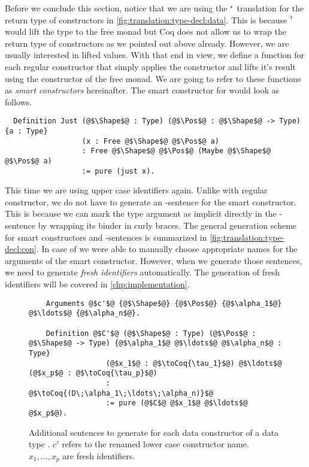 Before we conclude this section, notice that we are using the ${}^{*}$ translation for the return type of constructors in \autoref{fig:translation:type-decl:data}.
This is because ${}^{\dagger}$ would lift the type to the free monad but Coq does not allow us to wrap the return type of constructors as we pointed out above already.
However, we are usually interested in lifted values.
With that end in view, we define a function for each regular constructor that simply applies the constructor and lifts it's result using the  constructor of the free monad.
We are going to refer to these functions as \textit{smart constructors} hereinafter.
The smart constructor for  would look as follows.
\begin{verbatim}
  Definition Just (@$\Shape$@ : Type) (@$\Pos$@ : @$\Shape$@ -> Type) {a : Type}
                  (x : Free @$\Shape$@ @$\Pos$@ a)
                  : Free @$\Shape$@ @$\Pos$@ (Maybe @$\Shape$@ @$\Pos$@ a)
                  := pure (just x).
\end{verbatim}
This time we are using upper case identifiers again.
Unlike with regular constructor, we do not have to generate an -sentence for the smart constructor.
This is because we can mark the type argument as implicit directly in the -sentence by wrapping its binder in curly braces.
The general generation scheme for smart constructors and -sentences is summarized in \autoref{fig:translation:type-decl:con}.
In case of  we were able to manually choose appropriate names for the arguments of the smart constructor.
However, when we generate those sentences, we need to generate \textit{fresh identifiers} automatically.
The generation of fresh identifiers will be covered in \autoref{chp:implementation}. %

\begin{figure}[H]
  \begin{verbatim}
    Arguments @$c'$@ {@$\Shape$@} {@$\Pos$@} {@$\alpha_1$@} @$\ldots$@ {@$\alpha_n$@}.

    Definition @$C'$@ (@$\Shape$@ : Type) (@$\Pos$@ : @$\Shape$@ -> Type) {@$\alpha_1$@ @$\ldots$@ @$\alpha_n$@ : Type}
                  (@$x_1$@ : @$\toCoq{\tau_1}$@) @$\ldots$@ (@$x_p$@ : @$\toCoq{\tau_p}$@)
                  : @$\toCoq{(D\;\alpha_1\;\ldots\;\alpha_n)}$@
                  := pure (@$C$@ @$x_1$@ @$\ldots$@ @$x_p$@).
  \end{verbatim}
  \caption{Additional sentences to generate for each data constructor  of a data type . $c'$ refers to the renamed lower case constructor name. $x_1, \ldots, x_p$ are fresh identifiers.}
  \label{fig:translation:type-decl:con}
\end{figure}

